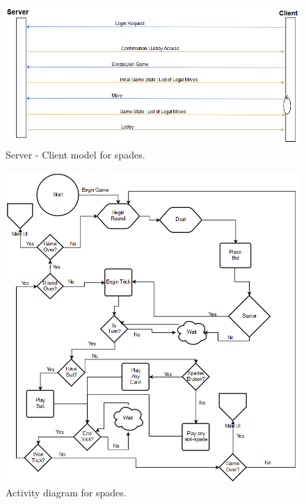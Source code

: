 \begin{figure}
		\begin{center}
		\includegraphics{graphics/SLfigure1}
		\caption{Server - Client model for spades.}
		\label{Figure 1}
		\end{center}
	\end{figure}
	
	\begin{figure}
		\begin{center}
		\includegraphics{graphics/SLfigure2}
		\caption{Activity diagram for spades.}
		\label{Figure 1}
		\end{center}
	\end{figure}
	


	
